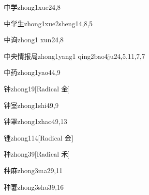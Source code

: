 \begin{verbete}{中学}{zhong1xue2}{4,8}
\end{verbete}

\begin{verbete}{中学生}{zhong1xue2sheng1}{4,8,5}
\end{verbete}

\begin{verbete}{中询}{zhong1 xun2}{4,8}
\end{verbete}

\begin{verbete}{中央情报局}{zhong1yang1 qing2bao4ju2}{4,5,11,7,7}
\end{verbete}

\begin{verbete}{中药}{zhong1yao4}{4,9}
\end{verbete}

\begin{verbete}{钟}{zhong1}{9}[Radical 金]
\end{verbete}

\begin{verbete}{钟室}{zhong1shi4}{9,9}
\end{verbete}

\begin{verbete}{钟罩}{zhong1zhao4}{9,13}
\end{verbete}

\begin{verbete}{锺}{zhong1}{14}[Radical 金]
\end{verbete}

\begin{verbete}{种}{zhong3}{9}[Radical 禾]
\end{verbete}

\begin{verbete}{种麻}{zhong3ma2}{9,11}
\end{verbete}

\begin{verbete}{种薯}{zhong3shu3}{9,16}
\end{verbete}

